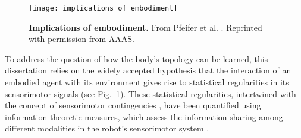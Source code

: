 \begin{figure}[t!]
	\begin{center}
		\texttt{[image: implications\_of\_embodiment]}
		\caption{\textbf{Implications of embodiment.} From Pfeifer et al. \cite{Pfeifer2007SelfOrganizationEmbodiment}. Reprinted with permission from AAAS.}
		\label{fig:implications_of_embodiment}
	\end{center}
\end{figure}
To address the question of how the body's topology can be learned, this dissertation relies on the widely accepted hypothesis that the interaction of an embodied agent with its environment gives rise to statistical regularities in its sensorimotor signals \cite{Pfeifer2006InformationTheoreticImplications,Pfeifer2007SelfOrganizationEmbodiment,LungarellaEmbodimentInformationCausal,Pfeifer2006Howbodyshapes} (see Fig.~\ref{fig:implications_of_embodiment}). These statistical regularities, intertwined with the concept of sensorimotor contingencies \cite{Jacquey2019Sensorimotorcontingenciesas}, have been quantified using information-theoretic measures, which assess the information sharing among different modalities in the robot's sensorimotor system \cite{Schmidt2013Bootstrappingperceptionusing,Lungarella2006Mappinginformationflow,Polani2009Modelsinformationprocessing,Bossomaier2016introductiontransferentropy,Olsson2006unknownsensorsactuators}. 
